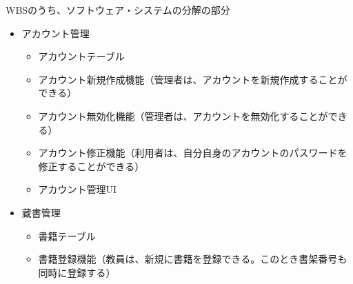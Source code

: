 \documentclass[a4paper]{jarticle}
\begin{document}
\begin{enumerate}
\begin{itemize}

WBSのうち、ソフトウェア・システムの分解の部分
  \begin{itemize}
   \item アカウント管理
    \begin{itemize}
     \item アカウントテーブル
     \item アカウント新規作成機能（管理者は、アカウントを新規作成することができる）
     \item アカウント無効化機能（管理者は、アカウントを無効化することができる）
     \item アカウント修正機能（利用者は、自分自身のアカウントのパスワードを修正することができる）
     \item アカウント管理UI
    \end{itemize}
   \item 蔵書管理
    \begin{itemize}
     \item 書籍テーブル
     \item 書籍登録機能（教員は、新規に書籍を登録できる。このとき書架番号も同時に登録する）

\end{itemize}
\end{itemize}
\end{itemize}
\end{enumerate}
\end{document}
